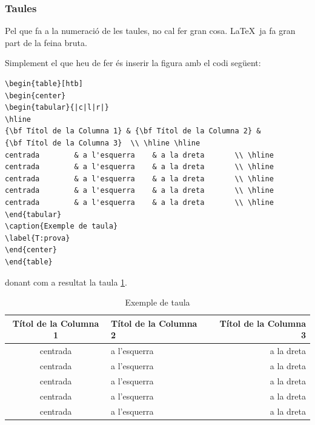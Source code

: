 

\subsubsection{Taules}

Pel que fa a la numeració de les taules, no cal fer gran cosa. \LaTeX \ ja fa gran part de la feina bruta. 

Simplement el que heu de fer és inserir la figura amb el codi següent:

\begin{verbatim}
\begin{table}[htb]
\begin{center}
\begin{tabular}{|c|l|r|}
\hline
{\bf Títol de la Columna 1} & {\bf Títol de la Columna 2} & 
{\bf Títol de la Columna 3}  \\ \hline \hline
centrada        & a l'esquerra    & a la dreta       \\ \hline
centrada        & a l'esquerra    & a la dreta       \\ \hline
centrada        & a l'esquerra    & a la dreta       \\ \hline
centrada        & a l'esquerra    & a la dreta       \\ \hline
centrada        & a l'esquerra    & a la dreta       \\ \hline
\end{tabular}
\caption{Exemple de taula}
\label{T:prova}
\end{center}
\end{table}
\end{verbatim}

donant com a resultat la taula \ref{T:prova}.


\begin{table}[htb]
\caption{Exemple de taula}
\begin{center}
\begin{tabular}{|c|l|r|}
\hline
{\bf Títol de la Columna 1} & {\bf Títol de la Columna 2} & {\bf Títol de la Columna 3}  \\ \hline \hline
centrada        & a l'esquerra    & a la dreta       \\ \hline
centrada        & a l'esquerra    & a la dreta       \\ \hline
centrada        & a l'esquerra    & a la dreta       \\ \hline
centrada        & a l'esquerra    & a la dreta       \\ \hline
centrada        & a l'esquerra    & a la dreta       \\ \hline
\end{tabular}
\label{T:prova}
\end{center}
\end{table}

